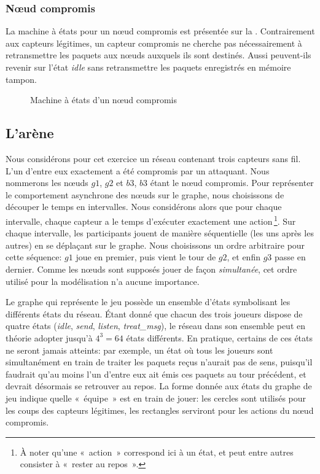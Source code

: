         \subsubsection{Nœud compromis}
La machine à états pour un nœud compromis est présentée sur la .
Contrairement aux capteurs légitimes, un capteur compromis ne cherche pas nécessairement à retransmettre les paquets aux nœuds auxquels ils sont destinés.
Aussi peuvent-ils revenir sur l'état \emph{idle} sans retransmettre les paquets enregistrés en mémoire tampon.
\begin{figure}[H]
    \centering
    
    \caption{Machine à états d'un nœud compromis}\label{tj:fig:autBadNode}
\end{figure}

\subsection{L'arène}
Nous considérons pour cet exercice un réseau contenant trois capteurs sans fil.
L'un d'entre eux exactement a été compromis par un attaquant.
Nous nommerons les nœuds $g1$, $g2$ et $b3$, $b3$ étant le nœud compromis.
Pour représenter le comportement asynchrone des nœuds sur le graphe, nous choisissons de découper le temps en intervalles.
Nous considérons alors que pour chaque intervalle, chaque capteur a le temps d'exécuter exactement une action\,\footnote{À noter qu'une « action » correspond ici à un état, et peut entre autres consister à « rester au repos ».}.
Sur chaque intervalle, les participants jouent de manière séquentielle (les uns après les autres) en se déplaçant sur le graphe.
Nous choisissons un ordre arbitraire pour cette séquence: $g1$ joue en premier, puis vient le tour de $g2$, et enfin $g3$ passe en dernier.
Comme les nœuds sont supposés jouer de façon \emph{simultanée}, cet ordre utilisé pour la modélisation n'a aucune importance.

Le graphe qui représente le jeu possède un ensemble d'états symbolisant les différents états du réseau.
Étant donné que chacun des trois joueurs dispose de quatre états (\emph{idle}, \emph{send}, \emph{listen}, \emph{treat\_msg}), le réseau dans son ensemble peut en théorie adopter jusqu'à $4^3=64$ états différents.
En pratique, certains de ces états ne seront jamais atteints: par exemple, un état où tous les joueurs sont simultanément en train de traiter les paquets reçus n'aurait pas de sens, puisqu'il faudrait qu'au moins l'un d'entre eux ait émis ces paquets au tour précédent, et devrait désormais se retrouver au repos.
La forme donnée aux états du graphe de jeu indique quelle « équipe » est en train de jouer: les cercles sont utilisés pour les coups des capteurs légitimes, les rectangles serviront pour les actions du nœud compromis.

